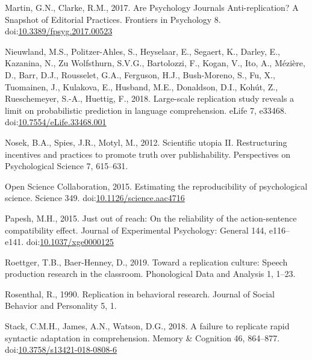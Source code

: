\documentclass[]{elsarticle} %
\newlength{\cslhangindent}
\newenvironment{CSLReferences}[2] %
 {%
  \setlength{\parindent}{0pt}
  \ifodd #1 \everypar{\setlength{\hangindent}{\cslhangindent}}\ignorespaces\fi
  \ifnum #2 > 0
  \setlength{\parskip}{#2\baselineskip}
  \fi
 }%
 {}
\begin{document}
\begin{CSLReferences}{1}{0}
\leavevmode{}%
Martin, G.N., Clarke, R.M., 2017. Are {Psychology} {Journals}
{Anti}-replication? {A} {Snapshot} of {Editorial} {Practices}. Frontiers
in Psychology 8.
doi:\href{https://doi.org/10.3389/fpsyg.2017.00523}{10.3389/fpsyg.2017.00523}

\leavevmode{}%
Nieuwland, M.S., Politzer-Ahles, S., Heyselaar, E., Segaert, K., Darley,
E., Kazanina, N., Zu Wolfsthurn, S.V.G., Bartolozzi, F., Kogan, V., Ito,
A., Mézière, D., Barr, D.J., Rousselet, G.A., Ferguson, H.J.,
Bush-Moreno, S., Fu, X., Tuomainen, J., Kulakova, E., Husband, M.E.,
Donaldson, D.I., Kohút, Z., Rueschemeyer, S.-A., Huettig, F., 2018.
Large-scale replication study reveals a limit on probabilistic
prediction in language comprehension. eLife 7, e33468.
doi:\href{https://doi.org/10.7554/eLife.33468.001}{10.7554/eLife.33468.001}

\leavevmode{}%
Nosek, B.A., Spies, J.R., Motyl, M., 2012. Scientific utopia {II}.
{Restructuring} incentives and practices to promote truth over
publishability. Perspectives on Psychological Science 7, 615--631.

\leavevmode{}%
Open Science Collaboration, 2015. Estimating the reproducibility of
psychological science. Science 349.
doi:\href{https://doi.org/10.1126/science.aac4716}{10.1126/science.aac4716}

\leavevmode{}%
Papesh, M.H., 2015. Just out of reach: {On} the reliability of the
action-sentence compatibility effect. Journal of Experimental
Psychology: General 144, e116--e141.
doi:\href{https://doi.org/10.1037/xge0000125}{10.1037/xge0000125}

\leavevmode{}%
Roettger, T.B., Baer-Henney, D., 2019. Toward a replication culture:
{Speech} production research in the classroom. Phonological Data and
Analysis 1, 1--23.

\leavevmode{}%
Rosenthal, R., 1990. Replication in behavioral research. Journal of
Social Behavior and Personality 5, 1.

\leavevmode{}%
Stack, C.M.H., James, A.N., Watson, D.G., 2018. A failure to replicate
rapid syntactic adaptation in comprehension. Memory \& Cognition 46,
864--877.
doi:\href{https://doi.org/10.3758/s13421-018-0808-6}{10.3758/s13421-018-0808-6}


\end{CSLReferences}
\end{document}
